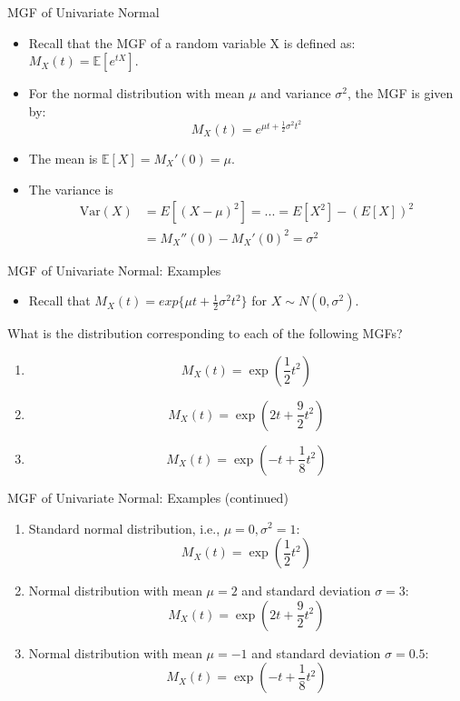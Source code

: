 \documentclass[
  ignorenonframetext,
]{beamer}
\providecommand{\tightlist}{%
  \setlength{\itemsep}{0pt}\setlength{\parskip}{0pt}}
\begin{document}
\begin{frame}{MGF of Univariate Normal}
\protect\hypertarget{mgf-of-univariate-normal}{}
\begin{itemize}
\item
  Recall that the MGF of a random variable X is defined as:
  \(M_X(t) = \mathbb{E}[e^{tX}]\).
\item
  For the normal distribution with mean \(\mu\) and variance
  \(\sigma^2\), the MGF is given by: \[
  M_X(t) = e^{\mu t + \frac{1}{2}\sigma^2t^2}
  \]
\item
  The mean is \(\mathbb{E}[X] = M_X'(0) = \mu\).
\item
  The variance is \[
  \begin{aligned}
  \text{Var}(X) &= E[(X-\mu)^2] = ... =E[X^2] - (E[X])^2\\
  &= M_X''(0) - M_X'(0)^2 = \sigma^2
  \end{aligned}\]
\end{itemize}
\end{frame}

\begin{frame}{MGF of Univariate Normal: Examples}
\protect\hypertarget{mgf-of-univariate-normal-examples}{}
\begin{itemize}
\tightlist
\item
  Recall that \(M_X(t)=exp\{\mu t + \frac{1}{2}{\sigma^2}t^2\}\) for
  \(X\sim N(0, \sigma^2)\).
\end{itemize}

What is the distribution corresponding to each of the following MGFs?

\begin{enumerate}
\item
  \[
     M_X(t) = \exp\left(\frac{1}{2}t^2\right)
     \]
\item
  \[
     M_X(t) = \exp\left(2t + \frac{9}{2}t^2\right)
     \]
\item
  \[
     M_X(t) = \exp\left(-t + \frac{1}{8}t^2\right)
     \]
\end{enumerate}
\end{frame}

\begin{frame}{MGF of Univariate Normal: Examples (continued)}
\protect\hypertarget{mgf-of-univariate-normal-examples-continued}{}
\begin{enumerate}
\item
  Standard normal distribution, i.e., \(\mu=0, \sigma^2=1\): \[
  M_X(t) = \exp\left(\frac{1}{2}t^2\right)
  \]
\item
  Normal distribution with mean \(\mu=2\) and standard deviation
  \(\sigma=3\): \[
  M_X(t) = \exp\left(2t + \frac{9}{2}t^2\right)
  \]
\item
  Normal distribution with mean \(\mu=-1\) and standard deviation
  \(\sigma=0.5\): \[
  M_X(t) = \exp\left(-t + \frac{1}{8}t^2\right)
  \]
\end{enumerate}
\end{frame}
\end{document}
